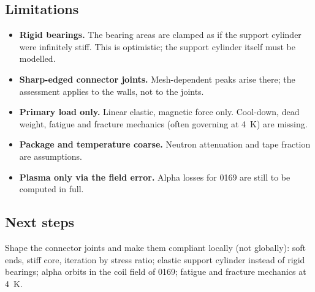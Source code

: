 \subsection*{Limitations}
\begin{itemize}\itemsep1pt
\item \textbf{Rigid bearings.} The bearing areas are clamped as if the support cylinder were infinitely stiff. This is
  optimistic; the support cylinder itself must be modelled.
\item \textbf{Sharp-edged connector joints.} Mesh-dependent peaks arise there; the assessment applies to the walls, not
  to the joints.
\item \textbf{Primary load only.} Linear elastic, magnetic force only. Cool-down, dead weight, fatigue and fracture
  mechanics (often governing at \SI{4}{K}) are missing.
\item \textbf{Package and temperature coarse.} Neutron attenuation and tape fraction are assumptions.
\item \textbf{Plasma only via the field error.} Alpha losses for 0169 are still to be computed in full.
\end{itemize}

\subsection*{Next steps}
Shape the connector joints and make them compliant locally (not globally): soft ends, stiff core, iteration by stress
ratio; elastic support cylinder instead of rigid bearings; alpha orbits in the coil field of 0169; fatigue and fracture
mechanics at \SI{4}{K}.
